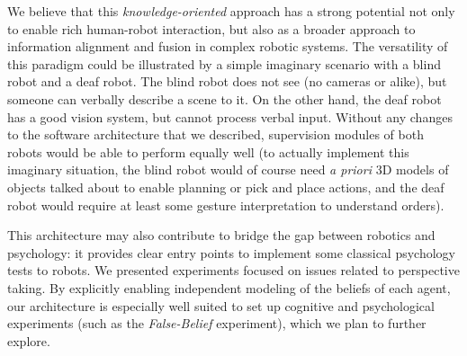 We believe that this \emph{knowledge-oriented} approach has a strong potential
not only to enable rich human-robot interaction, but also as a broader approach
to information alignment and fusion in complex robotic systems.  The
versatility of this paradigm could be illustrated by a simple imaginary
scenario with a blind robot and a deaf robot. The blind robot does not see (no
cameras or alike), but someone can verbally describe a scene to it. On the
other hand, the deaf robot has a good vision system, but cannot process verbal
input.  Without any changes to the software architecture that we described,
supervision modules of both robots would be able to perform equally well (to
actually implement this imaginary situation, the blind robot would of course
need \textit{a priori} 3D models of objects talked about to enable planning or
pick and place actions, and the deaf robot would require at least some gesture
interpretation to understand orders).

This architecture may also contribute to bridge the gap between robotics and
psychology: it provides clear entry points to implement some classical
psychology tests to robots. We presented experiments focused on issues related
to perspective taking. By explicitly enabling independent modeling of the
beliefs of each agent, our architecture is especially well suited to set up
cognitive and psychological experiments (such as the \emph{False-Belief}
experiment), which we plan to further explore.

